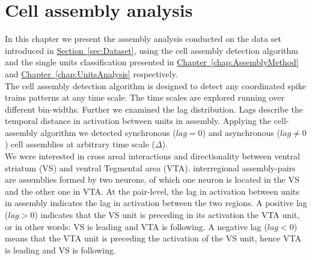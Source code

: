 \chapter{Cell assembly analysis}
\label{chap:AssemblyAnalysis}
In this chapter we present the assembly analysis conducted on the data set introduced in \hyperref[sec:Dataset]{Section~\ref*{sec:Dataset}}, using the cell assembly detection algorithm and the single units classification presented in \hyperref[chap:AssemblyMethod]{Chapter~\ref*{chap:AssemblyMethod}} and \hyperref[chap:UnitsAnalysis]{Chapter~\ref*{chap:UnitsAnalysis}} respectively.\\
The cell assembly detection algorithm is designed to detect any coordinated spike trains patterns at any time scale. The time scales are explored running over different bin-widths. Further we examined the lag distribution. Lags describe the temporal distance in activation between units in assembly. Applying the cell-assembly algorithm we detected synchronous ($lag=0$) and asynchronous ($lag\neq0$) cell assemblies at arbitrary time scale ($\Delta$).\\
We were interested in cross areal interactions and directionality between ventral striatum (VS) and ventral Tegmental area (VTA). interregional assembly-pairs are assemblies formed by two neurons, of which one neuron is located in  the VS and the other one in VTA. At the pair-level, the lag in activation between units in assembly indicates the lag in activation between the two regions. A positive lag ($lag>0$) indicates that the VS unit is preceding in its activation the VTA unit, or in other words: VS is leading and VTA is following. A negative lag ($lag<0$) means that the VTA unit is preceding the activation of the VS unit, hence VTA is leading and VS is following.
